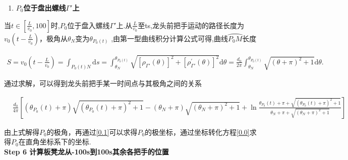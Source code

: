 \documentclass[../main.tex]{subfiles}
\begin{document}
\begin{enumerate}[start=4]
    \item \textbf{$P_0$位于盘出螺线$\varGamma'$上}
    \end{enumerate}  
    \par 当$t\in[\frac{L}{v_0},100]$时,$P_0$位于盘入螺线$\varGamma'$上.从$\frac{L}{v_0}$至ts,龙头前把手运动的路径长度为$v_0\left( t-\frac{L}{v_0} \right)$，极角从$\theta _N$变为$\theta _{P_0\left( t \right)} $ ,由第一型曲线积分计算公式可得,曲线$\wideparen{P_0M}$长度
    \begin{small}
    \begin{align}\label{1.........441}
        S=v_0\left( t-\frac{L}{v_0} \right) =\int_{P_0\left( t \right) N}{\mathrm{d}s}=\int_{\theta _N}^{\theta _{P_0\left( t \right)}}{\sqrt{\left[ \rho _{\varGamma \prime}\left( \theta \right) \right] ^2+\left[ \rho _{\varGamma \prime}^{\prime}\left( \theta \right) \right] ^2}\mathrm{d}\theta}=\frac{d_0}{2\pi}\int_{\theta _N}^{\theta _{P_0\left( t \right)}}{\sqrt{\left( \theta +\pi \right) ^2+1}\mathrm{d}\theta }.
    \end{align}
\end{small}
    \par 通过求解，可以得到龙头前把手某一时间点与其极角之间的关系
   \begin{small}
        \begin{align*}\label{1.........442}
        &\frac{d_0}{4\pi}\left[( \theta_{P_0}(t)+\pi)\sqrt{(\theta_{P_0}(t)+\pi)^{2}+1}-(\theta_N+\pi)\sqrt{(\theta_N+\pi)^{2}+1}+\ln\frac{\theta_{P_0}(t)+\pi+\sqrt{(\theta_{P_0}(t)+\pi)^{2}+1}}{\theta_N+\pi+\sqrt{(\theta_N+\pi)^{2}+1}}\right]
        \end{align*}
    \end{small}
    
    \par 由上式解得$P_0$的极角，再通过\eqref{0.1}可以求得$P_0$的极坐标，通过坐标转化方程\eqref{0.0}求得$P_0$在直角坐标系下的坐标.
\\\noindent\textbf{Step 6 计算板凳龙从-100s到100s其余各把手的位置} 
\end{document}
